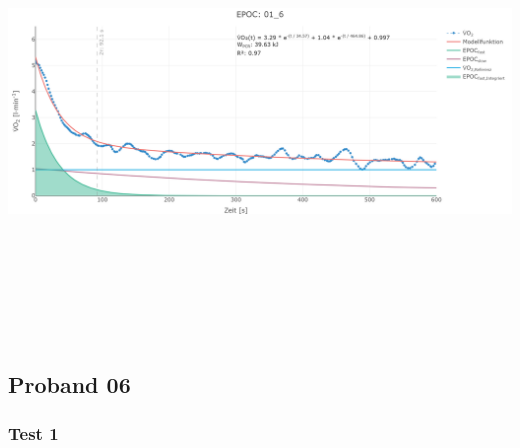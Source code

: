 \documentclass[
  letterpaper,
  DIV=11]{scrartcl}
\begin{document}
\includegraphics[width=11.45833in,height=4.6875in]{images/01_6.png}

\subsection{Proband 06}

\subsubsection{Test 1}
\end{document}
